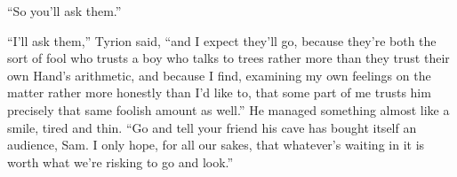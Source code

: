 “So you’ll ask them.”

“I’ll ask them,” Tyrion said, “and I expect they’ll go, because they’re both the sort of fool who trusts a boy who talks to trees rather more than they trust their own Hand’s arithmetic, and because I find, examining my own feelings on the matter rather more honestly than I’d like to, that some part of me trusts him precisely that same foolish amount as well.” He managed something almost like a smile, tired and thin. “Go and tell your friend his cave has bought itself an audience, Sam. I only hope, for all our sakes, that whatever’s waiting in it is worth what we’re risking to go and look.”